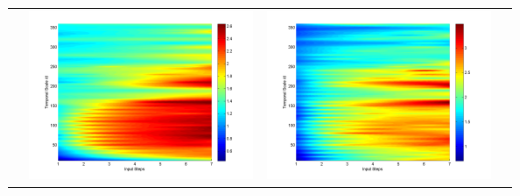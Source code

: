 \documentclass[11pt]{article}
\begin{document}
\begin{table}[H]
{\begin{tabular}{cccc}
&\begin{minipage}{.3\textwidth}\includegraphics[width=\linewidth]{resultgraph/11532500p.png}\end{minipage}
&\begin{minipage}{.3\textwidth}\includegraphics[width=\linewidth]{resultgraph/11532500pep.png}\end{minipage}

\end{tabular}}
\end{table}
\end{document}
